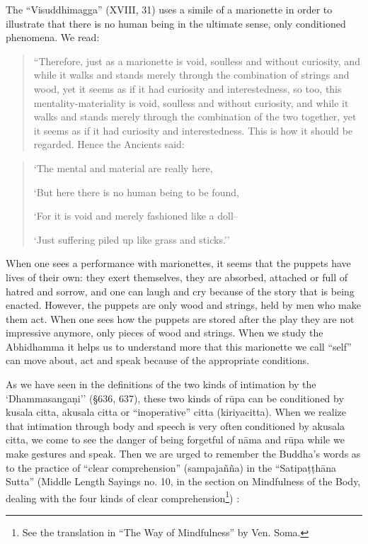 \documentclass{book}
\begin{document}
The ``Visuddhimagga'' (XVIII, 31) uses a simile of a marionette in order
to illustrate that there is no human being in the ultimate sense, only
conditioned phenomena. We read:




\begin{quote}\begin{flushleft}
``Therefore, just as a marionette is void, soulless and without
curiosity, and while it walks and stands merely through the combination
of strings and wood, yet it seems as if it had curiosity and
interestedness, so too, this mentality-materiality is void, soulless
and without curiosity, and while it walks and stands merely through the
combination of the two together, yet it seems as if it had curiosity
and interestedness. This is how it should be regarded. Hence the
Ancients said:
\end{flushleft}\end{quote}

\begin{verse}
`The mental and material are really here,

`But here there is no human being to be found,

`For it is void and merely fashioned like a doll--

`Just suffering piled up like grass and sticks.''

\end{verse}



When one sees a performance with marionettes, it seems that the puppets
have lives of their own: they exert themselves, they are absorbed,
attached or full of hatred and sorrow, and one can laugh and cry
because of the story that is being enacted. However, the puppets are
only wood and strings, held by men who make them act. When one sees how
the puppets are stored after the play they are not impressive anymore,
only pieces of wood and strings. When we study the Abhidhamma it helps
us to understand more that this marionette we call ``self'' can move
about, act and speak because of the appropriate conditions.

As we have seen in the definitions of the two kinds of intimation by the
`Dhamma\-sanga\d ni'' ({\S}636, 637), these two kinds of r\=upa can be
conditioned by kusala citta, akusala citta or ``inoperative'' citta
(kiriyacitta). When we realize that intimation through body and speech
is very often conditioned by akusala citta, we come to see the danger
of being forgetful of n{\=a}ma and r\=upa while we make gestures and
speak. Then we are urged to remember the Buddha's words as to the
practice of ``clear comprehension'' (sampaja\~n\~na) in the
``Satipa\d t\d th{\=a}na Sutta'' (Middle Length Sayings no. 10, in the
section on Mindfulness of the Body, dealing with the four kinds of
clear comprehension\footnote{See the translation in ``The Way of
Mindfulness'' by Ven. Soma.}) :
\end{document}
